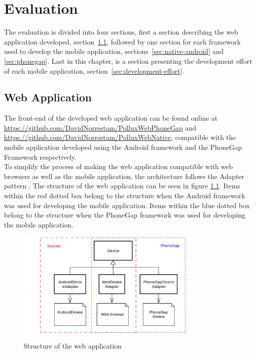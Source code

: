 \chapter{Evaluation}	\label{ch:evaluation}
The evaluation is divided into four sections, first a section describing the web application developed, section~\ref{sec:web-application}, followed by one section for each framework used to develop the mobile application, sections~\ref{sec:native-android} and \ref{sec:phonegap}. Last in this chapter, is a section presenting the development effort of each mobile application, section~\ref{sec:development-effort}.

\section{Web Application}\label{sec:web-application}
The front-end of the developed web application can be found online at \url{https://github.com/DavidNorrestam/PolluxWebPhoneGap} and \url{https://github.com/DavidNorrestam/PolluxWebNative}, compatible with the mobile application developed using the Android framework and the PhoneGap Framework respectively.
\\
To simplify the process of making the web application compatible with web browsers as well as the mobile application, the architecture follows the Adapter pattern \cite[p.~317]{martin2003}. The structure of the web application can be seen in figure \ref{fig:webuml}. Items within the red dotted box belong to the structure when the Android framework was used for developing the mobile application. Items within the blue dotted box belong to the structure when the PhoneGap framework was used for developing the mobile application.

\begin{figure}[h!]
	\centering
    \includegraphics[width=90mm,natwidth=600,natheight=450]{./img/webuml.png}
    \caption{Structure of the web application}
	\label{fig:webuml}
\end{figure}

